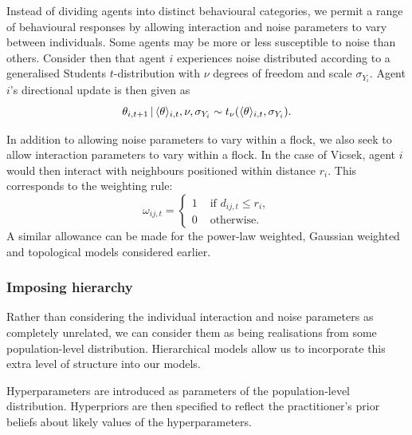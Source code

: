 Instead of dividing agents into distinct behavioural categories, we permit a
range of behavioural responses by allowing interaction and noise parameters to
vary between individuals. Some agents may be more or less susceptible to noise
than others. Consider then that agent $i$ experiences noise distributed
according to a generalised Students $t$-distribution with $\nu$ degrees of
freedom and scale $\sigma_{Y_i}$. Agent $i$'s directional update is then given
as
\begin{equation*}
  \theta_{i,t+1} \,|\, \langle\theta\rangle_{i,t}, \nu, \sigma_{Y_i} \sim
    t_{\nu}(\langle\theta\rangle_{i,t}, \sigma_{Y_i}).
\end{equation*}

In addition to allowing noise parameters to vary within a flock, we also seek
to allow interaction parameters to vary within a flock. In the case of Vicsek,
agent $i$ would then interact with neighbours positioned within distance $r_i$.
This corresponds to the weighting rule:
\begin{equation}
    \omega_{ij,t} =
    \begin{cases}
        1 & \text{ if } d_{ij, t} \leq r_i,\\
        0 & \text{ otherwise.}
    \end{cases}
\end{equation}
A similar allowance can be made for the power-law weighted, Gaussian weighted
and topological models considered earlier.

\subsubsection{Imposing hierarchy}
\label{ssec:hier_mod}

Rather than considering the individual interaction and noise parameters as
completely unrelated, we can consider them as being realisations from some
population-level distribution. Hierarchical models allow us to incorporate this
extra level of structure into our models.

Hyperparameters are introduced as parameters of the population-level
distribution. Hyperpriors are then specified to reflect the practitioner's
prior beliefs about likely values of the hyperparameters.

